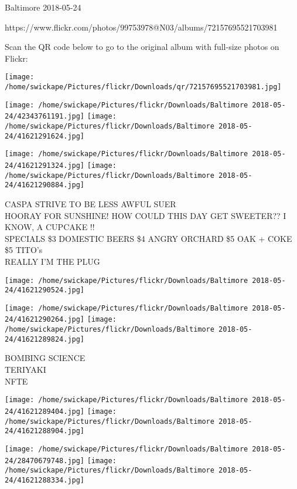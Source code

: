 \documentclass[10pt,letterpaper]{article}
\begin{document}
Baltimore 2018-05-24

https://www.flickr.com/photos/99753978@N03/albums/72157695521703981

Scan the QR code below to go to the original album with full-size photos on Flickr:

\texttt{[image: /home/swickape/Pictures/flickr/Downloads/qr/72157695521703981.jpg]}
\pagebreak

\texttt{[image: /home/swickape/Pictures/flickr/Downloads/Baltimore 2018-05-24/42343761191.jpg]}
\texttt{[image: /home/swickape/Pictures/flickr/Downloads/Baltimore 2018-05-24/41621291624.jpg]}

\texttt{[image: /home/swickape/Pictures/flickr/Downloads/Baltimore 2018-05-24/41621291324.jpg]}
\texttt{[image: /home/swickape/Pictures/flickr/Downloads/Baltimore 2018-05-24/41621290884.jpg]}

CASPA STRIVE TO BE LESS AWFUL SUER\\
HOORAY FOR SUNSHINE!  HOW COULD THIS DAY GET SWEETER??  I KNOW, A CUPCAKE !!\\
SPECIALS \$3 DOMESTIC BEERS \$4 ANGRY ORCHARD \$5 OAK + COKE \$5 TITO's\\
REALLY I'M THE PLUG\\
\pagebreak

\texttt{[image: /home/swickape/Pictures/flickr/Downloads/Baltimore 2018-05-24/41621290524.jpg]}

\vspace{0.25in}
\texttt{[image: /home/swickape/Pictures/flickr/Downloads/Baltimore 2018-05-24/41621290264.jpg]}
\texttt{[image: /home/swickape/Pictures/flickr/Downloads/Baltimore 2018-05-24/41621289824.jpg]}

BOMBING SCIENCE\\
TERIYAKI\\
NFTE\\
\pagebreak

\texttt{[image: /home/swickape/Pictures/flickr/Downloads/Baltimore 2018-05-24/41621289404.jpg]}
\texttt{[image: /home/swickape/Pictures/flickr/Downloads/Baltimore 2018-05-24/41621288904.jpg]}

\texttt{[image: /home/swickape/Pictures/flickr/Downloads/Baltimore 2018-05-24/28470679748.jpg]}
\texttt{[image: /home/swickape/Pictures/flickr/Downloads/Baltimore 2018-05-24/41621288334.jpg]}
\end{document}
